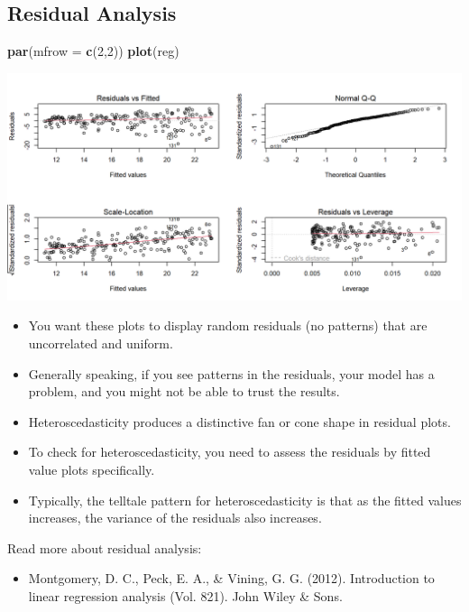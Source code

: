\documentclass[
]{book}
\newenvironment{Shaded}{\begin{snugshade}}{\end{snugshade}}
\newcommand{\AttributeTok}[1]{\textcolor[rgb]{0.13,0.29,0.53}{#1}}
\newcommand{\DecValTok}[1]{\textcolor[rgb]{0.00,0.00,0.81}{#1}}
\newcommand{\FunctionTok}[1]{\textcolor[rgb]{0.13,0.29,0.53}{\textbf{#1}}}
\newcommand{\NormalTok}[1]{#1}
\providecommand{\tightlist}{%
  \setlength{\itemsep}{0pt}\setlength{\parskip}{0pt}}
\begin{document}
\hypertarget{residual-analysis}{%
\subsection{Residual Analysis}\label{residual-analysis}}

\begin{Shaded}
\begin{Highlighting}[]
\FunctionTok{par}\NormalTok{(}\AttributeTok{mfrow =} \FunctionTok{c}\NormalTok{(}\DecValTok{2}\NormalTok{,}\DecValTok{2}\NormalTok{))}
\FunctionTok{plot}\NormalTok{(reg)}
\end{Highlighting}
\end{Shaded}

\begin{center}\includegraphics{figure/unnamed-chunk-29-1} \end{center}

\begin{itemize}
\item
  You want these plots to display random residuals (no patterns) that are uncorrelated and uniform.
\item
  Generally speaking, if you see patterns in the residuals, your model has a problem, and you might not be able to trust the results.
\item
  Heteroscedasticity produces a distinctive fan or cone shape in residual plots.
\item
  To check for heteroscedasticity, you need to assess the residuals by fitted value plots specifically.
\item
  Typically, the telltale pattern for heteroscedasticity is that as the fitted values increases, the variance of the residuals also increases.
\end{itemize}

Read more about residual analysis:

\begin{itemize}
\tightlist
\item
  Montgomery, D. C., Peck, E. A., \& Vining, G. G. (2012). Introduction to linear regression analysis (Vol. 821). John Wiley \& Sons.
\end{itemize}
\end{document}
